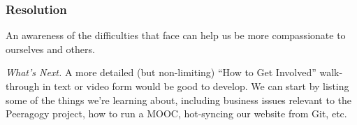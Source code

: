 \subsubsection*{Resolution}
An awareness of the difficulties that  face can
help us be more compassionate to ourselves and others.

\begin{framed}
\emph{What's Next.}
A more detailed (but non-limiting) ``How to Get Involved'' walk-through in text or video form would be good to develop. We can start by listing some of the things we're learning about, including business issues relevant to the Peeragogy project, how to run a MOOC, hot-syncing our website from Git, etc.
\end{framed}

\endgroup
